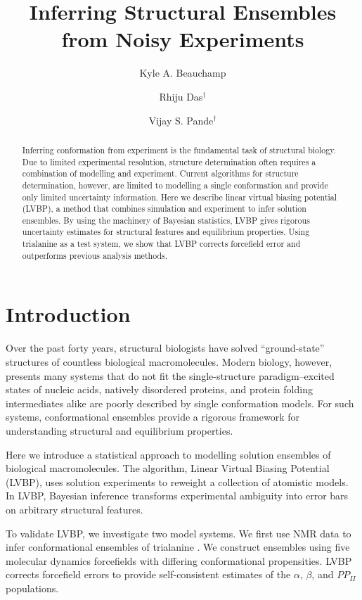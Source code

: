 \documentclass[journal=jacsat,manuscript=article]{achemso}
\author{Kyle A. Beauchamp}
\affiliation[Biophysics Program]{Biophysics Program}
\author{Rhiju Das$^\dagger$}
\affiliation[Biochemistry Department]{Biochemistry Department, Stanford University, Stanford, CA}
\author{Vijay S. Pande$^\dagger$}
\affiliation[Chemistry Department]{Chemistry Department, Stanford University, Stanford, CA}
\title{Inferring Structural Ensembles from Noisy Experiments}
\begin{document}
\maketitle

\begin{abstract}

Inferring conformation from experiment is the fundamental task of structural biology.  Due to limited experimental resolution, structure determination often requires a combination of modelling and experiment.  Current algorithms for structure determination, however, are limited to modelling a single conformation and provide only limited uncertainty information.  Here we describe linear virtual biasing potential (LVBP), a method that combines simulation and experiment to infer solution ensembles.  By using the machinery of Bayesian statistics, LVBP  gives rigorous uncertainty estimates for structural features and equilibrium properties.  Using trialanine as a test system, we show that LVBP corrects forcefield error and outperforms previous analysis methods.

\end{abstract}

\section{Introduction}

Over the past forty years, structural biologists have solved ``ground-state'' structures of countless biological macromolecules\cite{Berman2000}. Modern biology, however, presents many systems that do not fit the single-structure paradigm--excited states of nucleic acids\cite{dethoff2012}, natively disordered proteins\cite{fink2005}, and protein folding intermediates\cite{korzhnev2004} alike are poorly described by single conformation models.  For such systems, conformational ensembles provide a rigorous framework for understanding structural and equilibrium properties.  

Here we introduce a statistical approach to modelling solution ensembles of biological macromolecules.  The algorithm, Linear Virtual Biasing Potential (LVBP), uses solution experiments to reweight a collection of atomistic models.  In LVBP, Bayesian inference transforms experimental ambiguity into error bars on arbitrary structural features.  

To validate LVBP, we investigate two model systems.  We first use NMR data to infer conformational ensembles of trialanine \cite{Graf2007}.  We construct ensembles using five molecular dynamics forcefields with differing conformational propensities.  LVBP corrects forcefield errors to provide self-consistent estimates of the $\alpha$, $\beta$, and $PP_{II}$ populations.  
\end{document}
